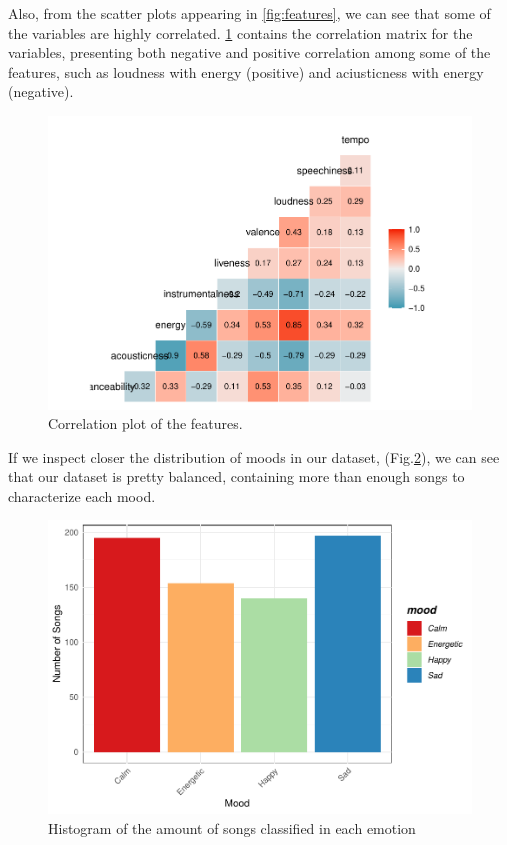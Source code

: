 \documentclass[11pt,]{article}
\begin{document}
Also, from the scatter plots appearing in \ref{fig:features}, we can see
that some of the variables are highly correlated. \ref{fig:cor} contains
the correlation matrix for the variables, presenting both negative and
positive correlation among some of the features, such as loudness with
energy (positive) and aciusticness with energy (negative).

\begin{figure}[H]
\includegraphics{figs/cor} \caption{Correlation plot of the features.}\label{fig:cor}
\end{figure}

If we inspect closer the distribution of moods in our dataset,
(Fig.\ref{fig:count}), we can see that our dataset is pretty balanced,
containing more than enough songs to characterize each mood.

\begin{figure}[H]
\includegraphics{figs/count} \caption{Histogram of the amount of songs classified in each emotion}\label{fig:count}
\end{figure}
\end{document}
